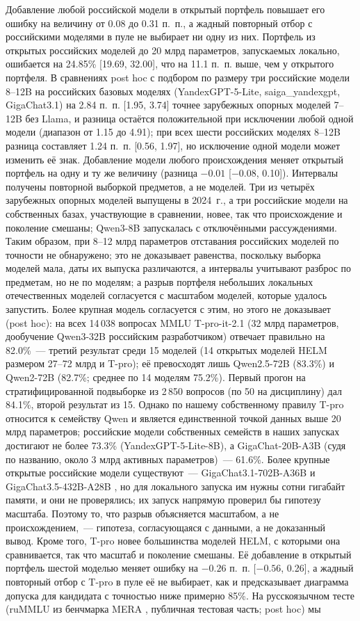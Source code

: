 \documentclass[preprint,12pt,authoryear]{elsarticle}
\begin{document}
Добавление любой российской модели в открытый портфель повышает его ошибку на величину от 0.08 до 0.31 п.~п., а жадный повторный отбор с российскими моделями в пуле не выбирает ни одну из них. Портфель из открытых российских моделей до 20 млрд параметров, запускаемых локально, ошибается на 24.85\% [19.69, 32.00], что на 11.1 п.~п. выше, чем у открытого портфеля. В сравнениях post hoc с подбором по размеру три российские модели 8--12B на российских базовых моделях (YandexGPT-5-Lite, saiga\_yandexgpt, GigaChat3.1) на 2.84 п.~п. [1.95, 3.74] точнее зарубежных опорных моделей 7--12B без Llama, и разница остаётся положительной при исключении любой одной модели (диапазон от 1.15 до 4.91); при всех шести российских моделях 8--12B разница составляет 1.24 п.~п. [0.56, 1.97], но исключение одной модели может изменить её знак. Добавление модели любого происхождения меняет открытый портфель на одну и ту же величину (разница $-0.01$ [$-0.08$, 0.10]). Интервалы получены повторной выборкой предметов, а не моделей. Три из четырёх зарубежных опорных моделей выпущены в 2024~г., а три российские модели на собственных базах, участвующие в сравнении, новее, так что происхождение и поколение смешаны; Qwen3-8B запускалась с отключёнными рассуждениями. Таким образом, при 8--12 млрд параметров отставания российских моделей по точности не обнаружено; это не доказывает равенства, поскольку выборка моделей мала, даты их выпуска различаются, а интервалы учитывают разброс по предметам, но не по моделям; а разрыв портфеля небольших локальных отечественных моделей согласуется с масштабом моделей, которые удалось запустить. Более крупная модель согласуется с этим, но этого не доказывает (post hoc): на всех 14\,038 вопросах MMLU T-pro-it-2.1 (32 млрд параметров, дообучение Qwen3-32B российским разработчиком) отвечает правильно на 82.0\%~--- третий результат среди 15 моделей (14 открытых моделей HELM размером 27--72 млрд и T-pro); её превосходят лишь Qwen2.5-72B (83.3\%) и Qwen2-72B (82.7\%; среднее по 14 моделям 75.2\%). Первый прогон на стратифицированной подвыборке из 2\,850 вопросов (по 50 на дисциплину) дал 84.1\%, второй результат из 15. Однако по нашему собственному правилу T-pro относится к семейству Qwen и является единственной точкой данных выше 20 млрд параметров; российские модели собственных семейств в наших запусках достигают не более 73.3\% (YandexGPT-5-Lite-8B), а GigaChat-20B-A3B (судя по названию, около 3 млрд активных параметров)~--- 61.6\%. Более крупные открытые российские модели существуют~--- GigaChat3.1-702B-A36B и GigaChat3.5-432B-A28B \citep{aisage2026gigachat}, но для локального запуска им нужны сотни гигабайт памяти, и они не проверялись; их запуск напрямую проверил бы гипотезу масштаба. Поэтому то, что разрыв объясняется масштабом, а не происхождением,~--- гипотеза, согласующаяся с данными, а не доказанный вывод. Кроме того, T-pro новее большинства моделей HELM, с которыми она сравнивается, так что масштаб и поколение смешаны. Её добавление в открытый портфель шестой моделью меняет ошибку на $-0.26$ п.~п. [$-0.56$, 0.26], а жадный повторный отбор с T-pro в пуле её не выбирает, как и предсказывает диаграмма допуска для кандидата с точностью ниже примерно 85\%. На русскоязычном тесте (ruMMLU из бенчмарка MERA \citep{fenogenova2024mera}, публичная тестовая часть; post hoc) мы 
\end{document}
